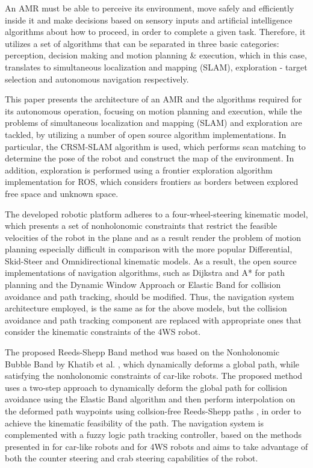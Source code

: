 \documentclass[conference]{IEEEtran}
\begin{document}
An AMR must be able to perceive its environment, move safely and efficiently inside it and make decisions based on sensory inputs and artificial intelligence algorithms about how to proceed, in order to complete a given task. Therefore, it utilizes a set of algorithms that can be separated in three basic categories: perception, decision making and motion planning \& execution, which in this case, translates to simultaneous localization and mapping (SLAM), exploration - target selection and autonomous navigation respectively.

This paper presents the architecture of an AMR and the algorithms required for its autonomous operation, focusing on motion planning and execution, while the problems of simultaneous localization and mapping (SLAM) and exploration are tackled, by utilizing a number of open source algorithm implementations. In particular, the CRSM-SLAM \cite{crsm} algorithm is used, which performs scan matching to determine the pose of the robot and construct the map of the environment. In addition, exploration is performed using a frontier exploration algorithm implementation for ROS, which considers frontiers as borders between explored free space and unknown space.

The developed robotic platform adheres to a four-wheel-steering kinematic model, which presents a set of nonholonomic constraints that restrict the feasible velocities of the robot in the plane and as a result render the problem of motion planning especially difficult in comparison with the more popular Differential, Skid-Steer and Omnidirectional kinematic models. As a result, the open source implementations of navigation algorithms, such as Dijkstra and A* for path planning and the Dynamic Window Approach \cite{dwa} or Elastic Band \cite{eband} for collision avoidance and path tracking, should be modified. Thus, the navigation system architecture employed, is the same as for the above models, but the collision avoidance and path tracking component are replaced with appropriate ones that consider the kinematic constraints of the 4WS robot.

The proposed Reeds-Shepp Band method was based on the Nonholonomic Bubble Band by Khatib et al. \cite{dpm}, which dynamically deforms a global path, while satisfying the nonholonomic constraints of car-like robots. The proposed method uses a two-step approach to dynamically deform the global path for collision avoidance using the Elastic Band algorithm and then perform interpolation on the deformed path waypoints using collsion-free Reeds-Shepp paths \cite{reeds_shepp}, in order to achieve the kinematic feasibility of the path. The navigation system is complemented with a fuzzy logic path tracking controller, based on the methods presented in \cite{flc_thesis} for car-like robots and \cite{reactive_fuzzy_ptc} for 4WS robots and aims to take advantage of both the counter steering and crab steering capabilities of the robot.
\end{document}

